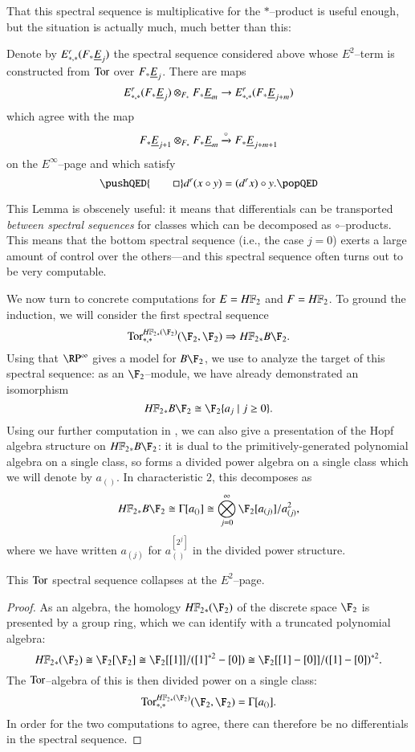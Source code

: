 That this spectral sequence is multiplicative for the $\ast$--product is useful enough, but the situation is actually much, much better than this:
\begin{lemma}\label{CircProductAndDifferentials}
Denote by $E^r_{*, *}(F_* \underline{\smash{E}}_{j})$ the spectral sequence considered above whose $E^2$--term is constructed from $\operatorname{Tor}$ over $F_* \underline{\smash{E}}_{j}$.  There are maps \[E^r_{*, *}(F_* \underline{\smash{E}}_{j}) \otimes_{F_*} F_* \underline{\smash{E}}_{m} \to E^r_{*, *}(F_* \underline{\smash{E}}_{j+m})\] which agree with the map \[F_* \underline{\smash{E}}_{j+1} \otimes_{F_*} F_* \underline{\smash{E}}_{m} \xrightarrow{\circ} F_* \underline{\smash{E}}_{j+m+1}\] on the $E^\infty$--page and which satisfy
\[
\pushQED{\qed}
d^r(x \circ y) = (d^r x) \circ y. \qedhere
\popQED
\]
\end{lemma}
\noindent This Lemma is obscenely useful: it means that differentials can be transported \emph{between spectral sequences} for classes which can be decomposed as $\circ$--products.  This means that the bottom spectral sequence (i.e., the case $j = 0$) exerts a large amount of control over the others---and this spectral sequence often turns out to be very computable.

We now turn to concrete computations for $E = \HFtwo$ and $F = \HFtwo$.  To ground the induction, we will consider the first spectral sequence \[\Tor^{\HFtwo_*(\F_2)}_{*, *}(\F_2, \F_2) \Rightarrow \HFtwo_* B\F_2.\]  Using that $\RP^\infty$ gives a model for $B\F_2$, we use  to analyze the target of this spectral sequence: as an $\F_2$--module, we have already demonstrated an isomorphism \[\HFtwo_* B\F_2 \cong \F_2\{a_j \mid j \ge 0\}.\]  Using our further computation in , we can also give a presentation of the Hopf algebra structure on $\HFtwo_* B\F_2$: it is dual to the primitively-generated polynomial algebra on a single class, so forms a divided power algebra on a single class which we will denote by $a_{()}$.  In characteristic $2$, this decomposes as \[\HFtwo_* B\F_2 \cong \Gamma[a_{()}] \cong \bigotimes_{j=0}^\infty \F_2[a_{(j)}] / a_{(j)}^2,\] where we have written $a_{(j)}$ for $a_{()}^{[2^j]}$ in the divided power structure.

\begin{corollary}
This $\operatorname{Tor}$ spectral sequence collapses at the $E^2$--page.
\end{corollary}
\begin{proof}
As an algebra, the homology $\HFtwo_*(\F_2)$ of the discrete space $\F_2$ is presented by a group ring, which we can identify with a truncated polynomial algebra: \[\HFtwo_*(\F_2) \cong \F_2[\F_2] \cong \F_2[[1]] / ([1]^{\ast 2} - [0]) \cong \F_2[[1] - [0]] / ([1] - [0])^{\ast 2}.\]  The $\operatorname{Tor}$--algebra of this is then divided power on a single class: \[\Tor^{\HFtwo_*(\F_2)}_{*, *}(\F_2, \F_2) = \Gamma[a_{()}].\]  In order for the two computations to agree, there can therefore be no differentials in the spectral sequence.
\end{proof}

